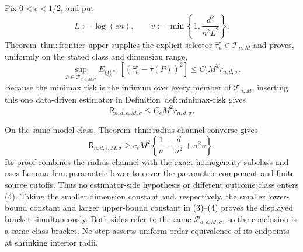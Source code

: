 Fix \(0<\epsilon<1/2\), and put
\[
 L:=\log(en),\qquad
 v:=\min\left\{1,\frac{d^2}{n^2L^2}\right\}.
\tag{1}
\]
Theorem~\(\mathrm{thm:frontier\text{-}upper}\) supplies the explicit selector \(\widehat\tau_n^\star\in\mathcal T_{n,M}\) and proves, uniformly on the stated class and dimension range,
\[
 \sup_{P\in\mathcal P_{d,\epsilon,M,\sigma}}
 E_{Q_P^{(n)}}[(\widehat\tau_n^\star-\tau(P))^2]
 \le C_\epsilon M^2r_{n,d,\sigma}.
\tag{2}
\]
Because the minimax risk is the infimum over every member of \(\mathcal T_{n,M}\), inserting this one data-driven estimator in Definition~\(\mathrm{def:minimax\text{-}risk}\) gives
\[
 \mathsf R_{n,d,\epsilon,M,\sigma}
 \le C_\epsilon M^2r_{n,d,\sigma}.
\tag{3}
\]

On the same model class, Theorem~\(\mathrm{thm:radius\text{-}channel\text{-}converse}\) gives
\[
 \mathsf R_{n,d,\epsilon,M,\sigma}
 \ge c_\epsilon M^2\left\{\frac1n+\frac d{n^2}+\sigma^2v\right\}.
\tag{4}
\]
Its proof combines the radius channel with the exact-homogeneity subclass and uses Lemma~\(\mathrm{lem:parametric\text{-}lower}\) to cover the parametric component and finite source cutoffs.  Thus no estimator-side hypothesis or different outcome class enters (4).  Taking the smaller dimension constant and, respectively, the smaller lower-bound constant and larger upper-bound constant in (3)--(4) proves the displayed bracket simultaneously.  Both sides refer to the same \(\mathcal P_{d,\epsilon,M,\sigma}\), so the conclusion is a same-class bracket.  No step asserts uniform order equivalence of its endpoints at shrinking interior radii.